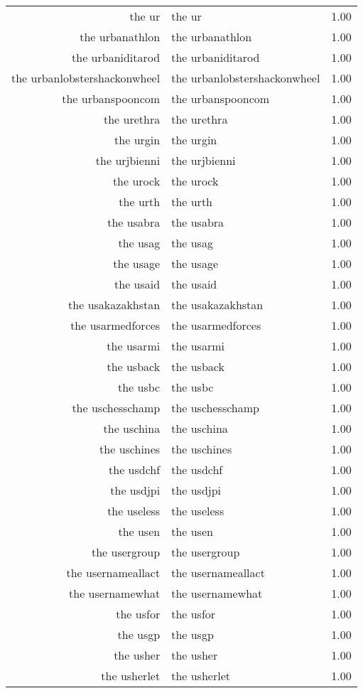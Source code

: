 \begin{table}[ht]
\begin{tabular}{rlr}
  the ur & the ur & 1.00 \\ 
  the urbanathlon & the urbanathlon & 1.00 \\ 
  the urbaniditarod & the urbaniditarod & 1.00 \\ 
  the urbanlobstershackonwheel & the urbanlobstershackonwheel & 1.00 \\ 
  the urbanspooncom & the urbanspooncom & 1.00 \\ 
  the urethra & the urethra & 1.00 \\ 
  the urgin & the urgin & 1.00 \\ 
  the urjbienni & the urjbienni & 1.00 \\ 
  the urock & the urock & 1.00 \\ 
  the urth & the urth & 1.00 \\ 
  the usabra & the usabra & 1.00 \\ 
  the usag & the usag & 1.00 \\ 
  the usage & the usage & 1.00 \\ 
  the usaid & the usaid & 1.00 \\ 
  the usakazakhstan & the usakazakhstan & 1.00 \\ 
  the usarmedforces & the usarmedforces & 1.00 \\ 
  the usarmi & the usarmi & 1.00 \\ 
  the usback & the usback & 1.00 \\ 
  the usbc & the usbc & 1.00 \\ 
  the uschesschamp & the uschesschamp & 1.00 \\ 
  the uschina & the uschina & 1.00 \\ 
  the uschines & the uschines & 1.00 \\ 
  the usdchf & the usdchf & 1.00 \\ 
  the usdjpi & the usdjpi & 1.00 \\ 
  the useless & the useless & 1.00 \\ 
  the usen & the usen & 1.00 \\ 
  the usergroup & the usergroup & 1.00 \\ 
  the usernameallact & the usernameallact & 1.00 \\ 
  the usernamewhat & the usernamewhat & 1.00 \\ 
  the usfor & the usfor & 1.00 \\ 
  the usgp & the usgp & 1.00 \\ 
  the usher & the usher & 1.00 \\ 
  the usherlet & the usherlet & 1.00 \\ 

\end{tabular}
\end{table}
